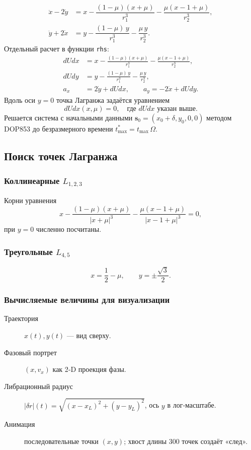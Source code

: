 \documentclass[12pt]{article}
\begin{document}
\[
\boxed{
\begin{aligned}
\ddot x-2\dot y &=
  x-\dfrac{(1-\mu)(x+\mu)}{r_1^{3}}
    -\dfrac{\mu(x-1+\mu)}{r_2^{3}},\\[6pt]
\ddot y+2\dot x &=
  y-\dfrac{(1-\mu)\,y}{r_1^{3}}
    -\dfrac{\mu\,y}{r_2^{3}}.
\end{aligned}}
\tag{EOM}
\]
Отдельный расчет в функции \texttt{rhs}:
\begin{align*}
dUdx &= x-\frac{(1-\mu)(x+\mu)}{r_1^{3}}
           -\frac{\mu(x-1+\mu)}{r_2^{3}},\\
dUdy &= y-\frac{(1-\mu)\,y}{r_1^{3}}
           -\frac{\mu\,y}{r_2^{3}},\\
a_x &=  2\dot y + dUdx,\qquad
a_y = -2\dot x + dUdy.
\end{align*}
Вдоль оси $y=0$ точка Лагранжа задаётся уравнением  
\[
dUdx(x,\mu)=0,
\quad\text{где }dUdx \text{ указан выше}.
\]
Решается система с начальными данными  
\(\mathbf s_0=(x_0+\delta,y_0,0,0)\)
методом DOP853 до безразмерного времени
\(t_{\max}^{*}=t_{\max}\,\Omega\).

\subsection{Поиск точек Лагранжа}

\subsubsection{Коллинеарные $L_{1,2,3}$}
Корни уравнения
\[
x-\frac{(1-\mu)(x+\mu)}{|x+\mu|^{3}}
 -\frac{\mu(x-1+\mu)}{|x-1+\mu|^{3}}=0,
\]
при $y=0$ численно посчитаны.
\subsubsection{Треугольные $L_{4,5}$}
\[
x=\frac12-\mu,\qquad
y=\pm\frac{\sqrt3}{2}.
\]

\subsubsection{Вычисляемые величины для визуализации}

\begin{description}
  \item[Траектория] $x(t),y(t)$ — вид сверху.
  \item[Фазовый портрет] $(x,v_x)$ как 2‑D проекция фазы.
  \item[Либрационный радиус] $|\delta r|(t)
    =\sqrt{(x-x_L)^2+(y-y_L)^2}$, ось $y$ в лог‑масштабе.
  \item[Анимация] последовательные точки $(x,y)$;
        хвост длины 300 точек создаёт «след».
\end{description}
\end{document}

